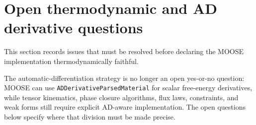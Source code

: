 \section{Open thermodynamic and AD derivative questions}
\label{sec:open_questions}

This section records issues that must be resolved before declaring the MOOSE
implementation thermodynamically faithful.

The automatic-differentiation strategy is no longer an open yes-or-no question:
MOOSE can use \texttt{ADDerivativeParsedMaterial} for scalar free-energy
derivatives, while tensor kinematics, phase closure algorithms, flux laws,
constraints, and weak forms still require explicit AD-aware implementation.
The open questions below specify where that division must be made precise.

